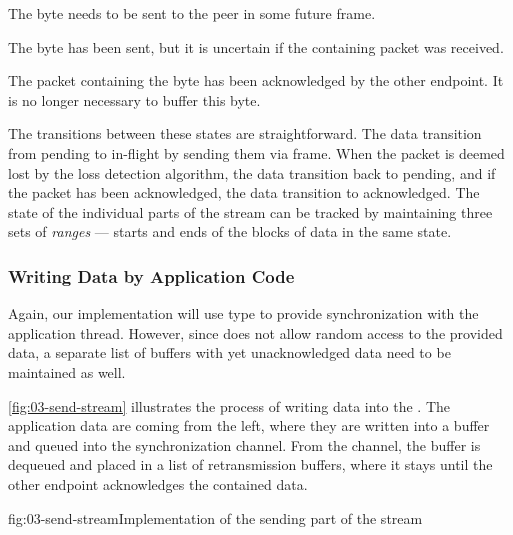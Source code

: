 \begin{itemize}

   The byte needs to be sent to the peer in some future \STREAM{} frame.

   The byte has been sent, but it is uncertain if the containing packet was
received.

   The packet containing the byte has been acknowledged by the other endpoint.
It is no longer necessary to buffer this byte.

\end{itemize}

The transitions between these states are straightforward. The data transition from pending to
in-flight by sending them via \STREAM{} frame. When the packet is deemed lost by the loss detection
algorithm, the data transition back to pending, and if the packet has been acknowledged, the data
transition to acknowledged. The state of the individual parts of the stream can be tracked by
maintaining three sets of \textit{ranges} --- starts and ends of the blocks of data in the same
state.

\subsubsection{Writing Data by Application Code}

Again, our implementation will use \ChannelOf{} type to provide synchronization with the
application thread. However, since \ChannelOf{} does not allow random access to the provided
data, a separate list of buffers with yet unacknowledged data need to be maintained as well.

\autoref{fig:03-send-stream} illustrates the process of writing data into the \SendStream{}. The
application data are coming from the left, where they are written into a buffer and queued into the
synchronization channel. From the channel, the buffer is dequeued and placed in a list of
retransmission buffers, where it stays until the other endpoint acknowledges the contained data.


\begin{myFigure}{fig:03-send-stream}{Implementation of the sending part of the stream}

  \resizebox{\linewidth}{!}{}

\end{myFigure}


